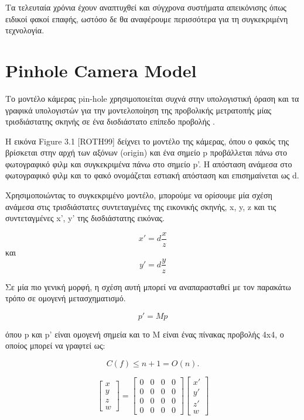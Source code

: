 Τα τελευταία χρόνια έχουν αναπτυχθεί και σύγχρονα συστήματα απεικόνισης όπως ειδικοί φακοί επαφής, ωστόσο δε θα αναφέρουμε περισσότερα για τη συγκεκριμένη τεχνολογία.




\section{Pinhole Camera Model}


Το μοντέλο κάμερας pin-hole χρησιμοποιείται συχνά στην υπολογιστική όραση και τα γραφικά υπολογιστών για την μοντελοποίηση της προβολικής μετρατοπής μίας τρισδιάστατης σκηνής σε ένα δισδιάστατο επίπεδο προβολής \cite{hartley2003multiple} .

Η εικόνα Figure 3.1 [ROTH99] δείχνει το μοντέλο της κάμερας, όπου ο φακός της βρίσκεται στην αρχή των αξόνων (origin) και ένα σημείο p προβάλλεται πάνω στο φωτογραφικό φιλμ και συγκεκριμένα πάνω στο σημείο p'. Η απόσταση ανάμεσα στο φωτογραφικό φιλμ και το φακό ονομάζεται εστιακή απόσταση και επισημαίνεται ως d.


Χρησιμοποιώντας το συγκεκριμένο μοντέλο, μπορούμε να ορίσουμε μία σχέση ανάμεσα στις τρισδιάστατες συντεταγμένες της εικονικής σκηνής, x, y, z και τις συντεταγμένες x', y' της δισδιάστατης εικόνας. 

\[ x' = d  \frac{x}{z}\] και \[ y' = d  \frac{y}{z}\]

Σε μία πιο γενική μορφή, η σχέση αυτή μπορεί να αναπαρασταθεί με τον παρακάτω τρόπο σε ομογενή μετασχηματισμό.

\[ p' = Mp\] 

όπου p και p’ είναι ομογενή σημεία και το M είναι ένας πίνακας προβολής 4x4, ο οποίος μπορεί να γραφτεί ως:


\begin{equation}
C(f) \leq n + 1 = O(n).
\end{equation}


\begin{equation}
\begin{bmatrix}
x\\ 
y\\ 
z\\ 
w
\end{bmatrix}
=
\begin{bmatrix}
0 & 0 & 0 & 0 \\ 
0 & 0 & 0 & 0 \\ 
0 &  0  & 0  & 0 \\ 
0 & 0  & 0 & 0
\end{bmatrix}
\begin{bmatrix}
x'\\ 
y'\\ 
z'\\ 
w
\end{bmatrix}
\end{equation}


